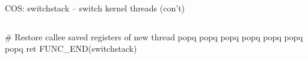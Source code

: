 \documentclass[11pt,aspectratio=169]{beamer}
\begin{document}
\begin{slide}{COS: switchstack -- switch kernel threads (con't)}
  \vspace{-1.7em}
  \begin{columns}
  \begin{asm}[numbers=left, firstnumber=25]

    # Restore callee saved registers of new thread
    popq    %
    popq    %
    popq    %
    popq    %
    popq    %
    popq    %
    popq    %
    ret
FUNC_END(switchstack)
  \end{asm}
\end{columns}
\end{slide}
\end{document}
